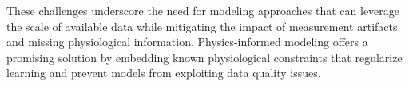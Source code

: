 These challenges underscore the need for modeling approaches that can leverage the scale of available data while mitigating the impact of measurement artifacts and missing physiological information. Physics-informed modeling offers a promising solution by embedding known physiological constraints that regularize learning and prevent models from exploiting data quality issues.




